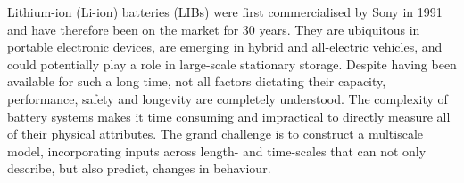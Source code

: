 \documentclass[../main.tex]{subfiles}
\begin{document}










Lithium-ion (Li-ion) batteries (LIBs) were first commercialised by Sony in 1991 and have therefore been on the market for 30 years. \cite{zeng2019commercialization} They are ubiquitous in portable electronic devices, are emerging in hybrid and all-electric vehicles, \cite{Goodenough2010} and could potentially play a role in large-scale stationary storage. \cite{kubiak2017calendar} Despite having been available for such a long time, not all factors dictating their capacity, performance, safety and longevity are completely understood. The complexity of battery systems makes it time consuming and impractical to directly measure all of their physical attributes. The grand challenge is to construct a multiscale model, incorporating inputs across length- and time-scales that can not only describe, but also predict, changes in behaviour.
\end{document}
